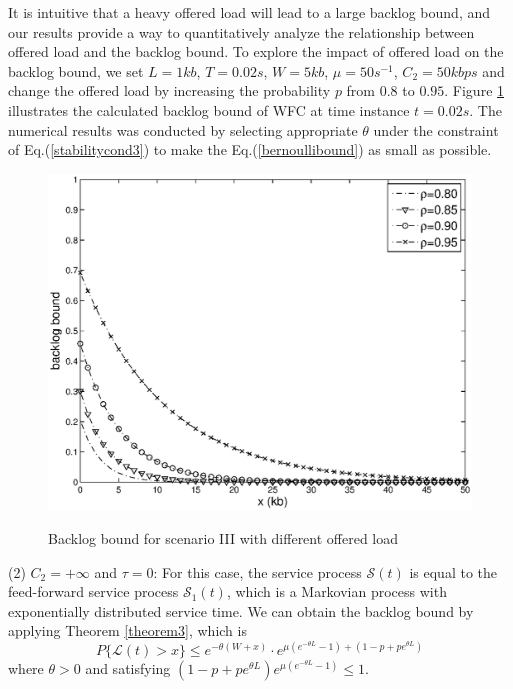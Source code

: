 \documentclass[12pt]{article}
\begin{document}
It is intuitive that a heavy offered load will lead to a large backlog bound, and our results  provide a way to quantitatively analyze the relationship between offered load and the backlog bound. To explore the impact of offered load on the backlog bound, we set $L=1kb$, $T=0.02s$, $W=5kb$, $\mu=50s^{-1}$, $C_2=50kbps$ and change the offered load by increasing the probability $p$ from $0.8$ to $0.95$. Figure \ref{result2} illustrates the calculated backlog bound of WFC at time instance $t=0.02s$. The numerical results was conducted by selecting appropriate $\theta$ under the constraint of Eq.(\ref{stabilitycond3}) to make the Eq.(\ref{bernoullibound}) as small as possible.
\begin{figure}
  \centering
  \includegraphics[scale=0.45]{figures/backlogrho.eps}\\
  \caption{Backlog bound for scenario III with different offered load}\label{result2}
\end{figure}

(2) $C_2=+\infty$ and $\tau=0$: For this case, the service process $\mathcal{S}(t)$ is equal to the feed-forward service process $\mathcal{S}_1(t)$, which is a Markovian process with exponentially distributed service time. We can obtain the backlog bound by applying Theorem \ref{theorem3}, which is
\begin{equation*}\label{equation3}
P\{\mathcal{L}(t)>x\}\leq e^{-\theta(W+x)}\cdot e^{\mu(e^{-\theta L}-1)+(1-p+pe^{\theta L})}
\end{equation*}
where $\theta>0$ and satisfying $(1-p+pe^{\theta L})e^{\mu(e^{-\theta L}-1)}\leq 1$.
\end{document}
